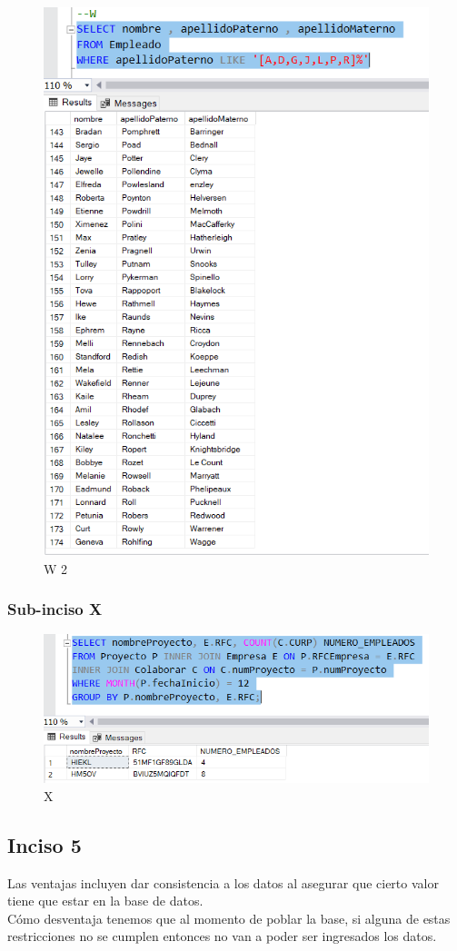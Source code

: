 \documentclass[a4paper, 12pt]{report}
\begin{document}
    \begin{figure}
        \includegraphics[width=\textwidth]
            {img/W2.png}\hfill
    \caption{W 2}
    \end{figure}

\subsubsection*{Sub-inciso X}
    \begin{figure}
        \includegraphics[width=\textwidth]
            {img/X.png}\hfill
    \caption{X}
    \end{figure}

\subsection*{Inciso 5}
Las ventajas incluyen dar consistencia a los datos al asegurar que cierto valor
tiene que estar en la base de datos.\\
Cómo desventaja tenemos que al momento de poblar la base, si alguna de estas
restricciones no se cumplen entonces no van a poder ser ingresados los datos.
\end{document}
